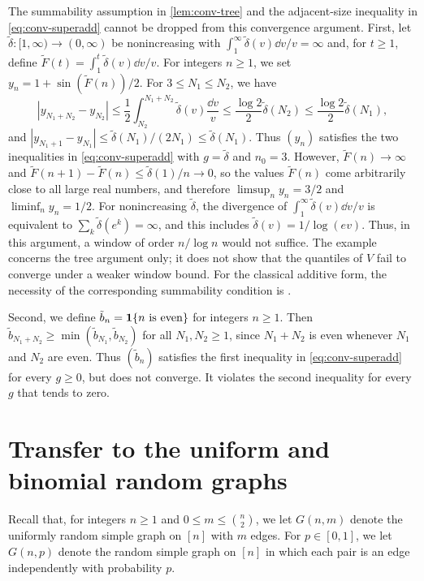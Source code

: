 \begin{remark}\label{rem:conv-necessity}
The summability assumption in \cref{lem:conv-tree} and the adjacent-size inequality in \eqref{eq:conv-superadd} cannot be dropped from this convergence argument. First, let $\tilde\delta \colon [1, \infty) \to (0, \infty)$ be nonincreasing with $\int_1^\infty \tilde\delta(v) \dd v/v = \infty$ and, for $t \ge 1$, define $\tilde F(t) = \int_1^t \tilde\delta(v) \dd v/v$. For integers $n \ge 1$, we set $y_n = 1 + \sin(\tilde F(n))/2$. For $3 \le N_1 \le N_2$, we have
\[
|y_{N_1 + N_2} - y_{N_2}| \le \frac 12 \int_{N_2}^{N_1 + N_2} \tilde\delta(v) \frac{\dd v}{v} \le \frac{\log 2}{2} \tilde\delta(N_2) \le \frac{\log 2}{2} \tilde\delta(N_1),
\]
and $|y_{N_1 + 1} - y_{N_1}| \le \tilde\delta(N_1)/(2N_1) \le \tilde\delta(N_1)$. Thus $(y_n)$ satisfies the two inequalities in \eqref{eq:conv-superadd} with $g = \tilde\delta$ and $n_0 = 3$. However, $\tilde F(n) \to \infty$ and $\tilde F(n + 1) - \tilde F(n) \le \tilde\delta(1)/n \to 0$, so the values $\tilde F(n)$ come arbitrarily close to all large real numbers, and therefore $\limsup_n y_n = 3/2$ and $\liminf_n y_n = 1/2$. For nonincreasing $\tilde\delta$, the divergence of $\int_1^\infty \tilde\delta(v) \dd v/v$ is equivalent to $\sum_k \tilde\delta(e^k) = \infty$, and this includes $\tilde\delta(v) = 1/\log(e v)$. Thus, in this argument, a window of order $n/\log n$ would not suffice. The example concerns the tree argument only; it does not show that the quantiles of $V$ fail to converge under a weaker window bound. For the classical additive form, the necessity of the corresponding summability condition is \cite[arXiv:1810.11723v1, Theorem~6]{furedi2020nearly}.

Second, we define $\tilde b_n = \mathbf 1\{n\text{ is even}\}$ for integers $n \ge 1$. Then $\tilde b_{N_1 + N_2} \ge \min(\tilde b_{N_1}, \tilde b_{N_2})$ for all $N_1, N_2 \ge 1$, since $N_1 + N_2$ is even whenever $N_1$ and $N_2$ are even. Thus $(\tilde b_n)$ satisfies the first inequality in \eqref{eq:conv-superadd} for every $g \ge 0$, but does not converge. It violates the second inequality for every $g$ that tends to zero.
\end{remark}

\section{Transfer to the uniform and binomial random graphs}\label{sec:conv-transfer}

Recall that, for integers $n \ge 1$ and $0 \le m \le \binom{n}{2}$, we let $G(n, m)$ denote the uniformly random simple graph on $[n]$ with $m$ edges. For $p \in [0, 1]$, we let $G(n, p)$ denote the random simple graph on $[n]$ in which each pair is an edge independently with probability $p$.

